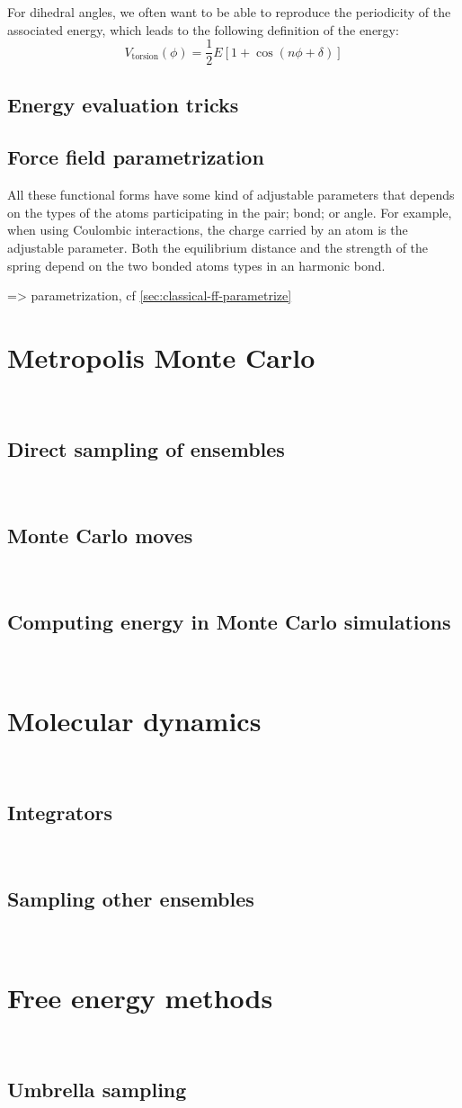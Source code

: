 \documentclass[thesis]{subfiles}
\begin{document}
For dihedral angles, we often want to be able to reproduce the periodicity of
the associated energy, which leads to the following definition of the energy:
\[V_\text{torsion}(\phi) = \frac 12 E \left[1 + \cos(n \phi + \delta)\right] \]

\subsection{Energy evaluation tricks}



\subsection{Force field parametrization}

All these functional forms have some kind of adjustable parameters that depends
on the types of the atoms participating in the pair; bond; or angle. For
example, when using Coulombic interactions, the charge carried by an atom is the
adjustable parameter. Both the equilibrium distance and the strength of the
spring depend on the two bonded atoms types in an harmonic bond.

=> parametrization, cf \ref{sec:classical-ff-parametrize}

\section{Metropolis Monte Carlo}
~

\subsection{Direct sampling of ensembles}
~

\subsection{Monte Carlo moves}
~

\subsection{Computing energy in Monte Carlo simulations}
~

\section{Molecular dynamics}
~

\subsection{Integrators}
~

\subsection{Sampling other ensembles}
~

\section{Free energy methods}
~

\subsection{Umbrella sampling}
~


\OnlyInSubfile{\printbibliography}
\end{document}

